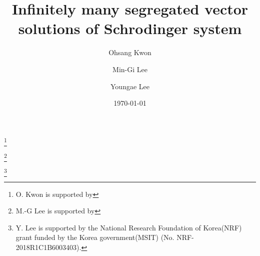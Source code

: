 \documentclass{amsart}
\theoremstyle{definition}
\theoremstyle{remark}
\numberwithin{equation}{section}
\begin{document}
 
\title{Infinitely many segregated vector solutions of Schrodinger system} 



\author{Ohsang Kwon}
\address{Department of Mathematics, Chungbuk National University, Cheongju, South Korea}
\thanks{O. Kwon is supported by }

\author{Min-Gi Lee}
\address{Department of Mathematics, Kyungpook National University, Daegu, South Korea}
\thanks{M.-G Lee is supported by }

\author{Youngae Lee}
\address{Department of Mathematical Sciences, College of Natural Sciences,  Ulsan National Institute of Science and Technology (UNIST), South Korea}
\thanks{ Y. Lee is supported by the National Research Foundation of Korea(NRF) grant funded by the Korea government(MSIT) (No. NRF-2018R1C1B6003403). }


\date{\today}



\begin{abstract}
 
\end{abstract}

\maketitle


\end{document}
